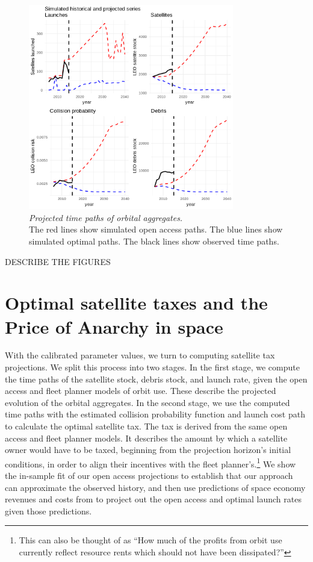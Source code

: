 \documentclass[12pt]{article}
\begin{document}
\begin{figure}[H]
	\centering
	\includegraphics[width=0.8\textwidth]{../../images/simulated_projected_series.png}
	\captionsetup{format=hang}
	\caption[Projected time paths of orbital aggregates]{\textit{Projected time paths of orbital aggregates.} \\
		The red lines show simulated open access paths. The blue lines show simulated optimal paths. The black lines show observed time paths.
	}
	\label{simulated_projected_path_of_states}
\end{figure}

DESCRIBE THE FIGURES

\section{Optimal satellite taxes and the Price of Anarchy in space}

With the calibrated parameter values, we turn to computing satellite tax projections. We split this process into two stages. In the first stage, we compute the time paths of the satellite stock, debris stock, and launch rate, given the open access and fleet planner models of orbit use. These describe the projected evolution of the orbital aggregates. In the second stage, we use the computed time paths with the estimated collision probability function and launch cost path to calculate the optimal satellite tax. The tax is derived from the same open access and fleet planner models. It describes the amount by which a satellite owner would have to be taxed, beginning from the projection horizon's initial conditions, in order to align their incentives with the fleet planner's.\footnote{This can also be thought of as ``How much of the profits from orbit use currently reflect resource rents which should not have been dissipated?'' } We show the in-sample fit of our open access projections to establish that our approach can approximate the observed history, and then use predictions of space economy revenues and costs from \citep{MSreport} to project out the open access and optimal launch rates given those predictions. 
\end{document}
